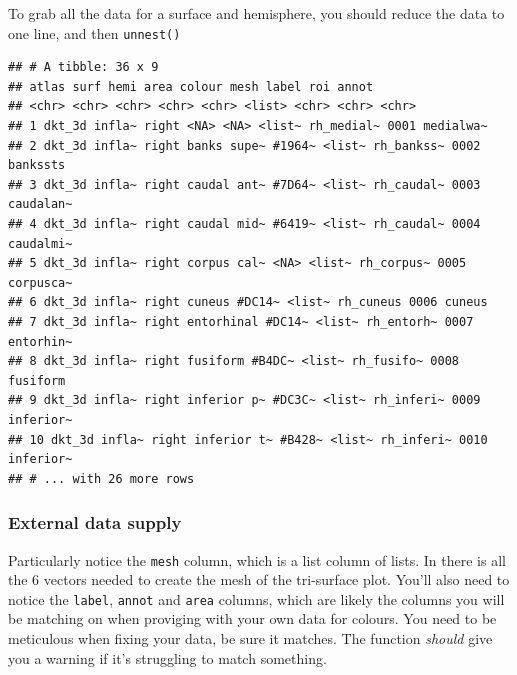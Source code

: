 \documentclass[fleqn,10pt]{wlpeerj} %
\newenvironment{Shaded}{\begin{snugshade}}{\end{snugshade}}
\newcommand{\KeywordTok}[1]{\textcolor[rgb]{0.13,0.29,0.53}{\textbf{#1}}}
\newcommand{\NormalTok}[1]{#1}
\newcommand{\OperatorTok}[1]{\textcolor[rgb]{0.81,0.36,0.00}{\textbf{#1}}}
\newcommand{\StringTok}[1]{\textcolor[rgb]{0.31,0.60,0.02}{#1}}
\begin{document}
\normalsize

To grab all the data for a surface and hemisphere, you should reduce the data to one line, and then \texttt{unnest()}

\begin{Shaded}
\end{Shaded}

\begin{verbatim}
## # A tibble: 36 x 9
## atlas surf hemi area colour mesh label roi annot
## <chr> <chr> <chr> <chr> <chr> <list> <chr> <chr> <chr>
## 1 dkt_3d infla~ right <NA> <NA> <list~ rh_medial~ 0001 medialwa~
## 2 dkt_3d infla~ right banks supe~ #1964~ <list~ rh_bankss~ 0002
bankssts
## 3 dkt_3d infla~ right caudal ant~ #7D64~ <list~ rh_caudal~ 0003
caudalan~
## 4 dkt_3d infla~ right caudal mid~ #6419~ <list~ rh_caudal~ 0004
caudalmi~
## 5 dkt_3d infla~ right corpus cal~ <NA> <list~ rh_corpus~ 0005
corpusca~
## 6 dkt_3d infla~ right cuneus #DC14~ <list~ rh_cuneus 0006 cuneus
## 7 dkt_3d infla~ right entorhinal #DC14~ <list~ rh_entorh~ 0007
entorhin~
## 8 dkt_3d infla~ right fusiform #B4DC~ <list~ rh_fusifo~ 0008
fusiform
## 9 dkt_3d infla~ right inferior p~ #DC3C~ <list~ rh_inferi~ 0009
inferior~
## 10 dkt_3d infla~ right inferior t~ #B428~ <list~ rh_inferi~ 0010
inferior~
## # ... with 26 more rows
\end{verbatim}

\hypertarget{external-data-supply}{%
\subsubsection{External data supply}\label{external-data-supply}}

Particularly notice the \texttt{mesh} column, which is a list column of lists.
In there is all the 6 vectors needed to create the mesh of the tri-surface plot.
You'll also need to notice the \texttt{label}, \texttt{annot} and \texttt{area} columns, which are likely the columns you will be matching on when proviging with your own data for colours.
You need to be meticulous when fixing your data, be sure it matches.
The function \emph{should} give you a warning if it's struggling to match something.
\end{document}
